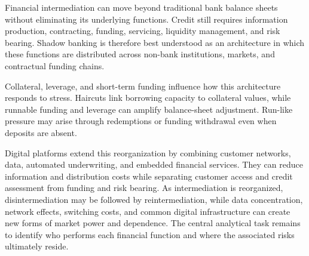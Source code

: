 

Financial intermediation can move beyond traditional bank balance sheets without eliminating its underlying functions. Credit still requires information production, contracting, funding, servicing, liquidity management, and risk bearing. Shadow banking is therefore best understood as an architecture in which these functions are distributed across non-bank institutions, markets, and contractual funding chains.

Collateral, leverage, and short-term funding influence how this architecture responds to stress. Haircuts link borrowing capacity to collateral values, while runnable funding and leverage can amplify balance-sheet adjustment. Run-like pressure may arise through redemptions or funding withdrawal even when deposits are absent.

Digital platforms extend this reorganization by combining customer networks, data, automated underwriting, and embedded financial services. They can reduce information and distribution costs while separating customer access and credit assessment from funding and risk bearing. As intermediation is reorganized, disintermediation may be followed by reintermediation, while data concentration, network effects, switching costs, and common digital infrastructure can create new forms of market power and dependence. The central analytical task remains to identify who performs each financial function and where the associated risks ultimately reside.



